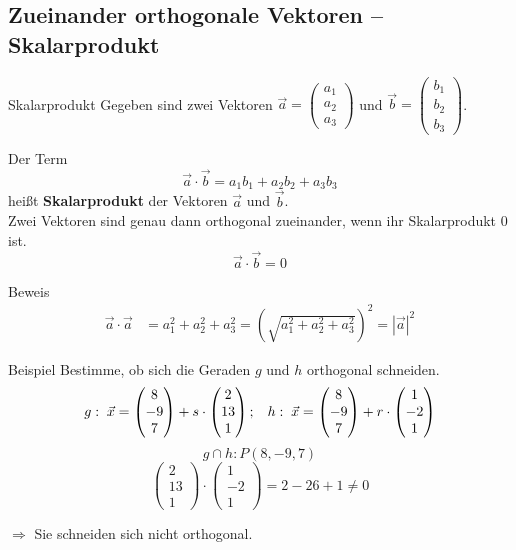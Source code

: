 \documentclass{article}
\begin{document}
\subsection{Zueinander orthogonale Vektoren -- Skalarprodukt}
\begin{boxx}[Red]{Skalarprodukt}
    Gegeben sind zwei Vektoren $\displaystyle \vec{a} = \begin{pmatrix}a_1\\a_2\\a_3\end{pmatrix}$
    und $\displaystyle \vec{b} = \begin{pmatrix}b_1\\b_2\\b_3\end{pmatrix}$.

    Der Term 
    \[\vec{a}\cdot \vec{b} = a_1b_1 + a_2b_2 + a_3b_3\]
    heißt \textbf{Skalarprodukt} der Vektoren $\vec{a}$ und $\vec{b}$.\\

    Zwei Vektoren sind genau dann orthogonal zueinander, wenn ihr Skalarprodukt $0$ ist.
    \[\vec{a} \cdot \vec{b} = 0\]
\end{boxx}
\begin{boxx}[Purple]{Beweis}
    \begin{align*}
        \vec{a} \cdot \vec{a} &= a_1^2 + a_2^2 + a_3^2 
        = \left(\sqrt{a_1^2 + a_2^2 + a_3^2 }\right)^2 
        = \left|\vec{a}\right|^2
    \end{align*}
\end{boxx}
\begin{boxx}[DarkBlue]{Beispiel}
    Bestimme, ob sich die Geraden $g$ und $h$ orthogonal schneiden.
    \[g:\;\vec{x} = \begin{pmatrix}8\\-9\\7\end{pmatrix} + s \cdot \begin{pmatrix}2\\13\\1\end{pmatrix};\hspace*{3mm}h:\;\vec{x} = \begin{pmatrix}8\\-9\\7\end{pmatrix} + r \cdot \begin{pmatrix}1\\-2\\1\end{pmatrix}\]
    \[g \cap h: P(8,-9,7)\]
    \[\begin{pmatrix}2\\13\\1\end{pmatrix} \cdot \begin{pmatrix}1\\-2\\1\end{pmatrix} = 2 - 26 +1 \not= 0\]
    \begin{center}
        $\Rightarrow$ Sie schneiden sich nicht orthogonal.
    \end{center}
\end{boxx}
\end{document}
